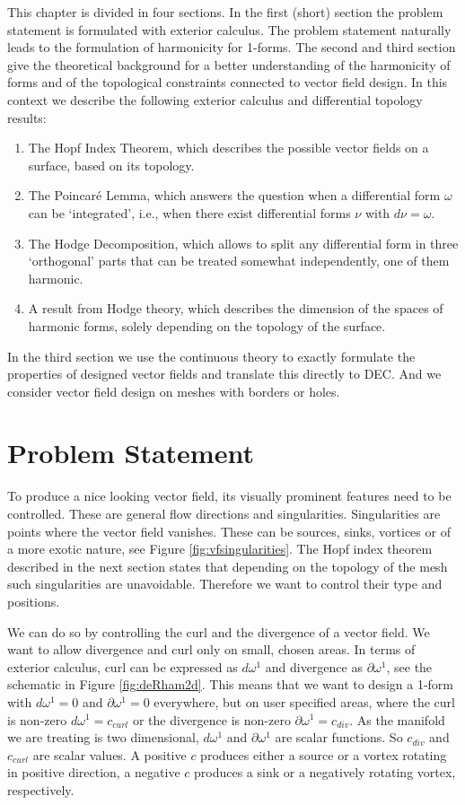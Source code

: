 This chapter is divided in four sections. In the first (short) section the problem statement is formulated with exterior calculus. The problem statement naturally leads to the formulation of harmonicity for 1-forms.  The second  and third section give the theoretical background for a better understanding of the harmonicity of forms and of the topological constraints connected to vector field design. In this context we describe the following exterior calculus and differential topology results:
\begin{enumerate}
\item The Hopf Index Theorem, which describes the possible vector fields on a surface, based on its topology.
\item The Poincar\'e Lemma, which answers the question when a differential form $\omega$ can be `integrated', i.e., when there exist differential forms $\nu$ with $d\nu = \omega$.
\item The Hodge Decomposition, which allows to split any differential form in three `orthogonal' parts that can be treated somewhat independently, one of them harmonic.
\item A result from Hodge theory, which describes the dimension of the spaces of harmonic forms, solely depending on the topology of the surface.
\end{enumerate}
In the third section we use the continuous theory to  exactly formulate the properties of designed vector fields and translate this directly to DEC. And we consider vector field design on meshes with borders or holes. 

\section{Problem Statement}
\label{sec:vfproblemstatement}
To produce a nice looking vector field, its visually prominent features need to be controlled. These are general flow directions and singularities.
Singularities are points where the vector field vanishes. These can be sources, sinks, vortices or of a more exotic nature, see Figure \ref{fig:vfsingularities}. The Hopf index theorem described in the next section states that depending on the topology of the mesh such singularities are unavoidable. Therefore we want to control their type and positions.

We can do so by controlling the curl and the divergence of a vector field. We want to allow divergence and curl only on small, chosen areas. In terms of exterior calculus, curl can be expressed as $d\omega^1$ and divergence as $\partial \omega^1$, see the schematic in Figure \ref{fig:deRham2d}. This means that we want to design a 1-form with $d\omega^1 = 0$ and $\partial \omega^1 = 0$ everywhere, but on user specified areas, where the curl is non-zero $d\omega^1 = c_{curl}$ or the divergence is non-zero  $\partial \omega^1 = c_{div}$. As the manifold we are treating is two dimensional, $d\omega^1$ and $\partial \omega^1$ are scalar functions. So $c_{div}$ and $c_{curl}$ are scalar values. A positive $c$ produces either a source or a vortex rotating in positive direction, a negative $c$ produces a sink or a negatively rotating vortex, respectively.

